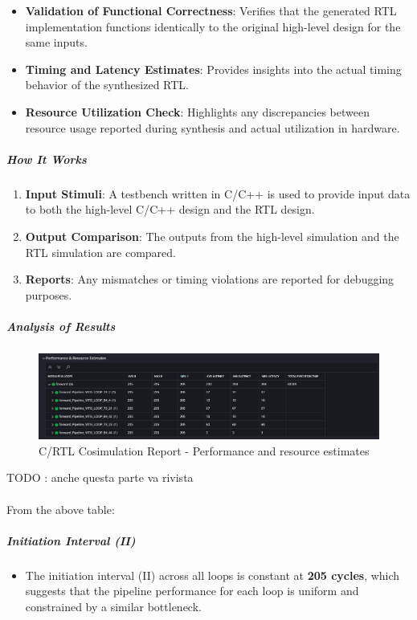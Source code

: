 \documentclass{article}
\begin{document}
\begin{itemize}
    \item \textbf{Validation of Functional Correctness}: Verifies that the generated RTL implementation functions identically to the original high-level design for the same inputs.
    \item \textbf{Timing and Latency Estimates}: Provides insights into the actual timing behavior of the synthesized RTL.
    \item \textbf{Resource Utilization Check}: Highlights any discrepancies between resource usage reported during synthesis and actual utilization in hardware.
\end{itemize}

\subparagraph{How It Works}
\begin{enumerate}
    \item \textbf{Input Stimuli}: A testbench written in C/C++ is used to provide input data to both the high-level C/C++ design and the RTL design.
    \item \textbf{Output Comparison}: The outputs from the high-level simulation and the RTL simulation are compared.
    \item \textbf{Reports}: Any mismatches or timing violations are reported for debugging purposes.
\end{enumerate}

\subparagraph{Analysis of Results}

\begin{figure}[H]
    \centering
    \includegraphics[width=1\textwidth]{./assets/MLP/c-rtl-cosimulation.png}
    \caption{C/RTL Cosimulation Report - Performance and resource estimates}
    \label{fig:C-RTL-cosimulation}
\end{figure}


TODO : anche questa parte va rivista
\\\\From the above table:

\subparagraph{Initiation Interval (II)}
\begin{itemize}
    \item The initiation interval (II) across all loops is constant at \textbf{205 cycles}, which suggests that the pipeline performance for each loop is uniform and constrained by a similar bottleneck.
\end{itemize}
\end{document}

